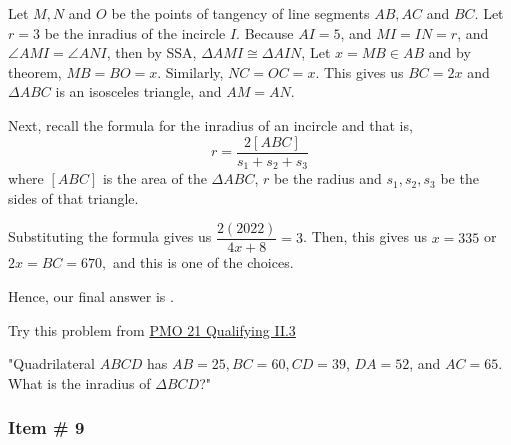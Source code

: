 \documentclass[11pt,paper=letter]{scrartcl}
\newenvironment{rem}%
{\noindent \ignorespaces \small \sffamily  \sansmath {\bfseries \color{DarkMidnightBlue} Remark.}}%
{\ignorespacesafterend}
\begin{document}
\begin{center}
\end{center}

Let $M, N$ and $O$ be the points of tangency of line segments $AB, AC$ and $BC.$ Let $r=3$ be the inradius of the incircle $I$. Because $AI = 5$, and $MI = IN = r$, and $\angle AMI = \angle ANI$, then by SSA, $\Delta AMI \cong \Delta AIN$, Let $x = MB \in AB$ and by theorem, $MB = BO = x$. Similarly, $NC = OC = x$. This gives us $BC = 2x$ and $\Delta ABC$ is an isosceles triangle, and $AM =AN$.

Next, recall the formula for the inradius of an incircle and that is, $$r = \dfrac{2[ABC]}{s_1 + s_2 + s_3}$$ where $[ABC]$ is the area of the $\Delta ABC$, $r$ be the radius and $s_1,s_2,s_3$ be the sides of that triangle. 

Substituting the formula gives us $\dfrac{2(2022)}{4x + 8} = 3$. Then, this gives us $x = 335 $ or $2x = BC = 670,$ and this is one of the choices.
    


Hence, our final answer is .

\begin{mdframed}
\begin{rem} Try this problem from \href{https://pmo.ph/wp-content/uploads/2019/01/21st-PMO-Qualifying-Stage.pdf}{PMO 21 Qualifying II.3}

"Quadrilateral $ABCD$ has $AB = 25, BC = 60, CD = 39$, $DA = 52$, and $AC = 65$. What is the
inradius of $\Delta BCD$?"

\end{rem}
\end{mdframed}
\subsubsection{Item \# 9}
\end{document}
